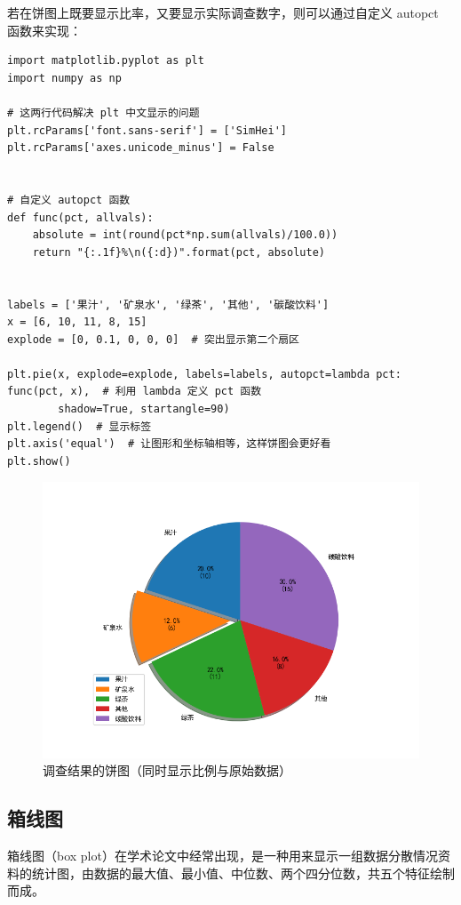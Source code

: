 若在饼图上既要显示比率，又要显示实际调查数字，则可以通过自定义 autopct 函数来实现：
\begin{lstlisting}[Language=Python]
import matplotlib.pyplot as plt
import numpy as np

# 这两行代码解决 plt 中文显示的问题
plt.rcParams['font.sans-serif'] = ['SimHei']
plt.rcParams['axes.unicode_minus'] = False


# 自定义 autopct 函数
def func(pct, allvals):
    absolute = int(round(pct*np.sum(allvals)/100.0))
    return "{:.1f}%\n({:d})".format(pct, absolute)


labels = ['果汁', '矿泉水', '绿茶', '其他', '碳酸饮料']
x = [6, 10, 11, 8, 15]
explode = [0, 0.1, 0, 0, 0]  # 突出显示第二个扇区

plt.pie(x, explode=explode, labels=labels, autopct=lambda pct: func(pct, x),  # 利用 lambda 定义 pct 函数
        shadow=True, startangle=90)
plt.legend()  # 显示标签
plt.axis('equal')  # 让图形和坐标轴相等，这样饼图会更好看
plt.show()
\end{lstlisting}

\begin{figure}[!ht]
  \centering
  \includegraphics[scale=0.7]{figure/pie2.png}
  \caption{调查结果的饼图（同时显示比例与原始数据）}\label{fig:pie}
\end{figure}

\clearpage
\subsection{箱线图}

箱线图（box plot）在学术论文中经常出现，是一种用来显示一组数据分散情况资料的统计图，由数据的最大值、最小值、中位数、两个四分位数，共五个特征绘制而成。


